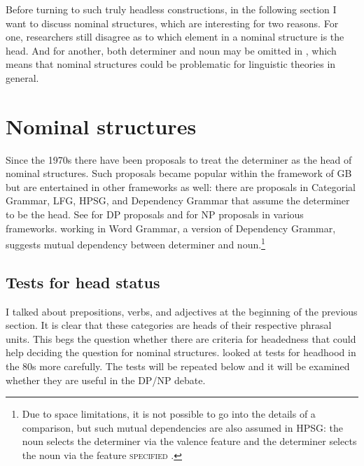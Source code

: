 \documentclass[output=paper
  ,nobabel
  ,draftmode
  ,uniformtopskip %
  ,colorlinks, citecolor=brown
]{langscibook}
\begin{document}
Before turning to such truly headless constructions, in the following section I want to discuss
nominal structures, which are interesting for two reasons. For one, researchers still disagree as to
which element in a nominal structure is the head. And for another, both determiner and noun may be
omitted in , which means that nominal structures could be problematic for linguistic theories
in general.  


\section{Nominal structures}
\label{sec-np-dp}
\label{sec-nominalstrukturen}

Since the 1970s there have been proposals to treat the determiner as the head of nominal structures.
Such proposals became popular within the framework of GB \citep{Chomsky81a} but are entertained in
other frameworks as well: there are proposals in Categorial Grammar, LFG, HPSG, and Dependency
Grammar that assume the determiner to be the head. See \textcites[]{Ajdukiewicz35a-u}{VH77a-u,
Brame82a}[--92]{Hudson84a-u}{Hellan86a,Abney87a,Netter94,Netter98a-Eng,vanLangendonck94a,Salzmann2020a,chapters/salzmann} for DP
proposals and \textcites[]{ps2,Demske2001a}[Section~6.6.1]{MuellerLehrbuch1}{Bruening2009a,Bruening2020a}
for NP proposals in various frameworks. \citet{Hudson2004a} working in Word Grammar, a version of
Dependency Grammar, suggests mutual dependency between determiner and noun.\footnote{%
  Due to space limitations, it is not possible to go into the details of a comparison, but such mutual
  dependencies are also assumed in HPSG: the noun selects the determiner via the valence feature
  \spr and the determiner selects the noun via the feature \textsc{specified} \citep[]{ps2}.
}

\subsection{Tests for head status}

I talked about prepositions, verbs, and adjectives
at the beginning of the previous section. It is clear that these categories are
heads of their respective phrasal units. This begs the question whether there are criteria for headedness
that could help deciding the question for nominal structures. \citet{Zwicky85a} looked at tests for
headhood in the 80s more carefully. The tests will be repeated below and it will be examined
whether they are useful in the DP/NP debate.
\end{document}
